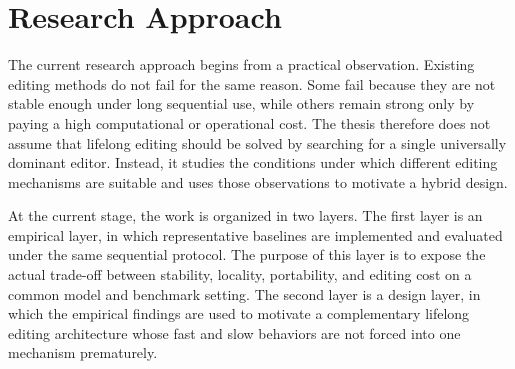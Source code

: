 \section{Research Approach}

The current research approach begins from a practical observation. Existing editing methods do not fail for the same reason. Some fail because they are not stable enough under long sequential use, while others remain strong only by paying a high computational or operational cost. The thesis therefore does not assume that lifelong editing should be solved by searching for a single universally dominant editor. Instead, it studies the conditions under which different editing mechanisms are suitable and uses those observations to motivate a hybrid design.

At the current stage, the work is organized in two layers. The first layer is an empirical layer, in which representative baselines are implemented and evaluated under the same sequential protocol. The purpose of this layer is to expose the actual trade-off between stability, locality, portability, and editing cost on a common model and benchmark setting. The second layer is a design layer, in which the empirical findings are used to motivate a complementary lifelong editing architecture whose fast and slow behaviors are not forced into one mechanism prematurely.
